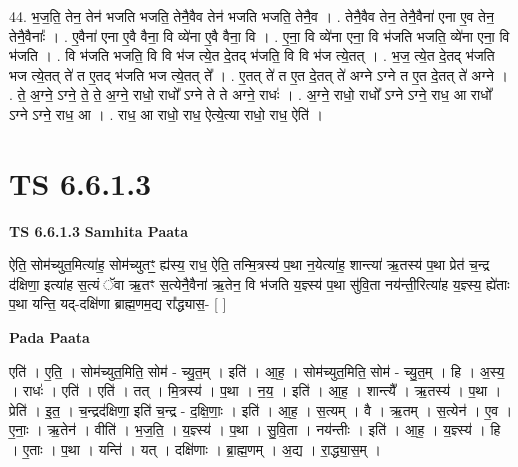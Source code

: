 \documentclass[17pt]{extarticle}
\begin{document}
44. भ॒ज॒ति॒ तेन॒ तेन॑ भजति भजति॒ तेनै॒वैव तेन॑ भजति भजति॒ तेनै॒व । . तेनै॒वैव तेन॒ तेनै॒वैना॑ एना ए॒व तेन॒ तेनै॒वैनाः᳚ । . ए॒वैना॑ एना ए॒वै वैना॒ वि व्ये॑ना ए॒वै वैना॒ वि । . ए॒ना॒ वि व्ये॑ना एना॒ वि भ॑जति भजति॒ व्ये॑ना एना॒ वि भ॑जति । . वि भ॑जति भजति॒ वि वि भ॑ज त्ये॒त दे॒तद् भ॑जति॒ वि वि भ॑ज त्ये॒तत् । . भ॒ज॒ त्ये॒त दे॒तद् भ॑जति भज त्ये॒तत् ते॑ त ए॒तद् भ॑जति भज त्ये॒तत् ते᳚ । . ए॒तत् ते॑ त ए॒त दे॒तत् ते॑ अग्ने ऽग्ने त ए॒त दे॒तत् ते॑ अग्ने । . ते॒ अ॒ग्ने॒ ऽग्ने॒ ते॒ ते॒ अ॒ग्ने॒ राधो॒ राधो᳚ ऽग्ने ते ते अग्ने॒ राधः॑ । . अ॒ग्ने॒ राधो॒ राधो᳚ ऽग्ने ऽग्ने॒ राध॒ आ राधो᳚ ऽग्ने ऽग्ने॒ राध॒ आ । . राध॒ आ राधो॒ राध॒ ऐत्ये॒त्या राधो॒ राध॒ ऐति॑ । \newline
\pagebreak
{}

\section{ TS 6.6.1.3 }

\textbf{TS 6.6.1.3 } \newline
\textbf{Samhita Paata} \newline

ऐति॒ सोम॑च्युत॒मित्या॑ह॒ सोम॑च्युतꣳ॒॒ ह्य॑स्य॒ राध॒ ऐति॒ तन्मि॒त्रस्य॑ प॒था न॒येत्या॑ह॒ शान्त्या॑ ऋ॒तस्य॑ प॒था प्रेत॑ च॒न्द्र द॑क्षिणा॒ इत्या॑ह स॒त्यं ॅवा ऋ॒तꣳ स॒त्येनै॒वैना॑ ऋ॒तेन॒ वि भ॑जति य॒ज्ञ्स्य॑ प॒था सु॑वि॒ता नय॑न्ती॒रित्या॑ह य॒ज्ञ्स्य॒ ह्ये॑ताः प॒था यन्ति॒ यद्-दक्षि॑णा ब्राह्म॒णम॒द्य रा᳚द्ध्यास॒- [  ] \newline

\textbf{Pada Paata} \newline

एति॑ । ए॒ति॒ । सोम॑च्युत॒मिति॒ सोम॑ - च्यु॒त॒म् । इति॑ । आ॒ह॒ । सोम॑च्युत॒मिति॒ सोम॑ - च्यु॒त॒म् । हि । अ॒स्य॒ । राधः॑ । एति॑ । एति॑ । तत् । मि॒त्रस्य॑ । प॒था । न॒य॒ । इति॑ । आ॒ह॒ । शान्त्यै᳚ । ऋ॒तस्य॑ । प॒था । प्रेति॑ । इ॒त॒ । च॒न्द्रद॑क्षिणा॒ इति॑ च॒न्द्र - द॒क्षि॒णाः॒ । इति॑ । आ॒ह॒ । स॒त्यम् । वै । ऋ॒तम् । स॒त्येन॑ । ए॒व । ए॒नाः॒ । ऋ॒तेन॑ । वीति॑ । भ॒ज॒ति॒ । य॒ज्ञ्स्य॑ । प॒था । सु॒वि॒ता । नय॑न्तीः । इति॑ । आ॒ह॒ । य॒ज्ञ्स्य॑ । हि । ए॒ताः । प॒था । यन्ति॑ । यत् । दक्षि॑णाः । ब्रा॒ह्म॒णम् । अ॒द्य । रा॒द्ध्या॒स॒म् ।  \newline
\end{document}
